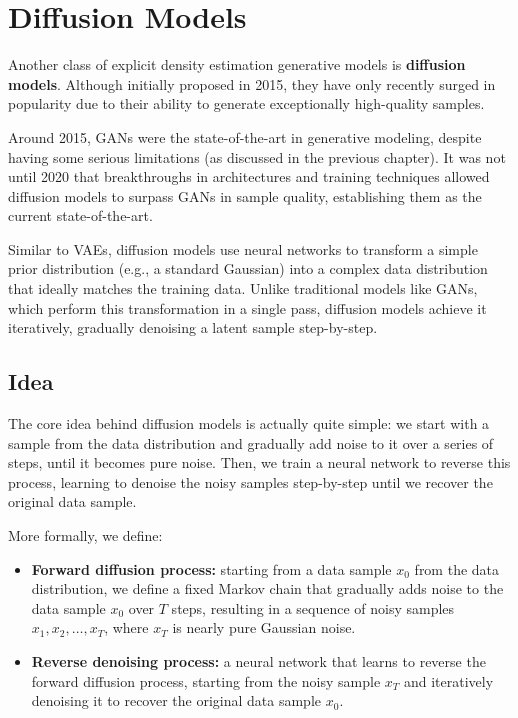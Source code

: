 \section{Diffusion Models}
Another class of explicit density estimation generative models is \textbf{diffusion models}. 
Although initially proposed in 2015, they have only recently surged in popularity due to their ability to generate exceptionally high-quality samples. 

Around 2015, GANs were the state-of-the-art in generative modeling, despite having some serious limitations (as discussed in the previous chapter). 
It was not until 2020 that breakthroughs in architectures and training techniques allowed diffusion models to surpass GANs in sample quality, establishing them as the current state-of-the-art.

Similar to VAEs, diffusion models use neural networks to transform a simple prior distribution (e.g., a standard Gaussian) into a complex data distribution that ideally matches the training data.
Unlike traditional models like GANs, which perform this transformation in a single pass, diffusion models achieve it iteratively, gradually denoising a latent sample step-by-step.

\subsection{Idea}
The core idea behind diffusion models is actually quite simple: 
we start with a sample from the data distribution and gradually add noise to it over a series of steps, until it becomes pure noise. 
Then, we train a neural network to reverse this process, learning to denoise the noisy samples step-by-step until we recover the original data sample.

More formally, we define:
\begin{itemize}
    \item \textbf{Forward diffusion process:} starting from a data sample $x_0$ from the data distribution, we define a fixed
    Markov chain that gradually adds noise to the data sample $x_0$ over $T$ steps, resulting in a sequence of noisy samples 
    $x_1, x_2, \ldots, x_T$, where $x_T$ is nearly pure Gaussian noise.

    \item \textbf{Reverse denoising process:} a neural network that learns to reverse the forward diffusion process,
    starting from the noisy sample $x_T$ and iteratively denoising it to recover the original data sample $x_0$.
\end{itemize}

